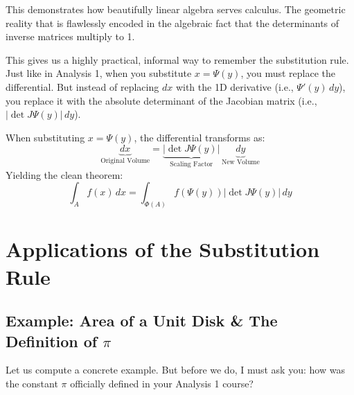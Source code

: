 \begin{didactic-insight}
This demonstrates how beautifully linear algebra serves calculus. The geometric reality that  is flawlessly encoded in the algebraic fact that the determinants of inverse matrices multiply to 1.
\end{didactic-insight}

\begin{spoken-clean}[00:10:45 - 00:12:15]
This gives us a highly practical, informal way to remember the substitution rule. Just like in Analysis 1, when you substitute $x = \Psi(y)$, you must replace the differential. But instead of replacing $dx$ with the 1D derivative (i.e., $\Psi'(y) \, dy$), you replace it with the absolute determinant of the Jacobian matrix (i.e., $|\det J\Psi(y)| \, dy$).
\end{spoken-clean}

\begin{nice-box}
\begin{theorem}\label{thm:practical_substitution}
When substituting $x = \Psi(y)$, the differential transforms as:
\[
\underbrace{dx}_{\text{Original Volume}} = \underbrace{|\det J\Psi(y)|}_{\text{Scaling Factor}} \, \underbrace{dy}_{\text{New Volume}}
\]
Yielding the clean theorem:
\[
\int_A f(x) \, dx = \int_{\Phi(A)} f(\Psi(y)) |\det J\Psi(y)| \, dy
\]
\end{theorem}
\end{nice-box}

\section{Applications of the Substitution Rule}
\subsection{Example: Area of a Unit Disk \& The Definition of \texorpdfstring{$\pi$}{pi}}

\begin{spoken-clean}[00:12:15 - 00:15:00]
Let us compute a concrete example. But before we do, I must ask you: how was the constant $\pi$ officially defined in your Analysis 1 course? 
\end{spoken-clean}

